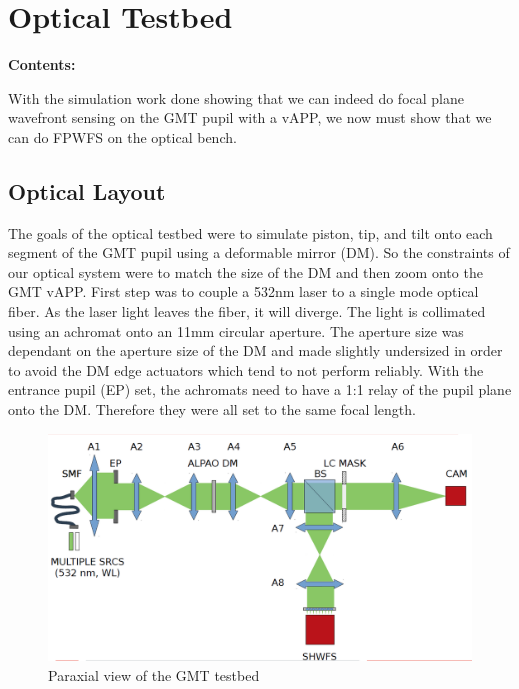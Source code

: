 
\chapter{Optical Testbed} %
\noindent\textbf{\large Contents:}

\noindent\hrulefill
\noindent\startcontents[chapters]
\noindent{}
\noindent\hrulefill
\label{Chapter3} %



With the simulation work done showing that we can indeed do focal plane wavefront sensing on the GMT pupil with a vAPP, we now must show that we can do FPWFS on the optical bench.

\section{Optical Layout}
\label{sec:optical_layout}

The goals of the optical testbed were to simulate piston, tip, and tilt onto each segment of the GMT pupil using a deformable mirror (DM).  So the constraints of our optical system were to match the size of the DM and then zoom onto the GMT vAPP.  First step was to couple a 532nm laser to a single mode optical fiber.  As the laser light leaves the fiber, it will diverge.  The light is collimated using an achromat onto an 11mm circular aperture.  The aperture size was dependant on the aperture size of the DM and made slightly undersized in order to avoid the DM edge actuators which tend to not perform reliably.  With the entrance pupil (EP) set, the achromats need to have a 1:1 relay of the pupil plane onto the DM.  Therefore they were all set to the same focal length.


\begin{figure}[H]
    \centering
    \includegraphics[width = 12cm]{Figures/optical_bed.png}
    \caption{Paraxial view of the GMT testbed}
    \label{fig:optical_layout}
\end{figure}

